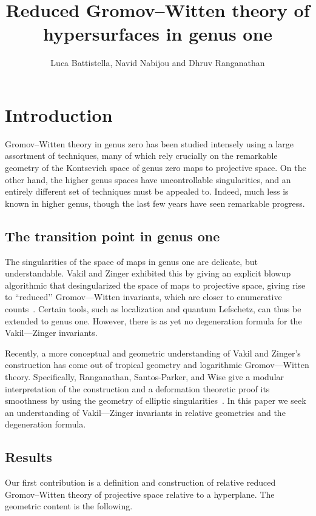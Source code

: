 \documentclass[11pt]{amsart}
\title{Reduced Gromov--Witten theory of hypersurfaces in genus one}
\author{Luca Battistella, Navid Nabijou and Dhruv Ranganathan}
\date{\thismonthyear}
\theoremstyle{definition}
\theoremstyle{definition}
\begin{document}
\begin{abstract}
\end{abstract}

\maketitle

\appendixtitletocoff
\tableofcontents


\section*{Introduction}

\noindent Gromov--Witten theory in genus zero has been studied intensely using a large assortment of techniques, many of which rely crucially on the remarkable geometry of the Kontsevich space of genus zero maps to projective space. On the other hand, the higher genus spaces have uncontrollable singularities, and an entirely different set of techniques must be appealed to. Indeed, much less is known in higher genus, though the last few years have seen remarkable progress. 

\subsection{The transition point in genus one} The singularities of the space of maps in genus one are delicate, but understandable. Vakil and Zinger exhibited this by giving an explicit blowup algorithmic that desingularized the space of maps to projective space, giving rise to ``reduced’’ Gromov—Witten invariants, which are closer to enumerative counts~\cite{VZ}. Certain tools, such as localization and quantum Lefschetz, can thus be extended to genus one. However, there is as yet no degeneration formula for the Vakil—Zinger invariants. 

Recently, a more conceptual and geometric understanding of Vakil and Zinger’s construction has come out of tropical geometry and logarithmic Gromov—Witten theory. Specifically, Ranganathan, Santos-Parker, and Wise give a modular interpretation of the construction and a deformation theoretic proof its smoothness by using the geometry of elliptic singularities~\cite{RSPW,RSPW2}. In this paper we seek an understanding of Vakil—Zinger invariants in relative geometries and the degeneration formula.

\subsection{Results} Our first contribution is a definition and construction of relative reduced Gromov--Witten theory of projective space relative to a hyperplane. The geometric content is the following.
\end{document}
